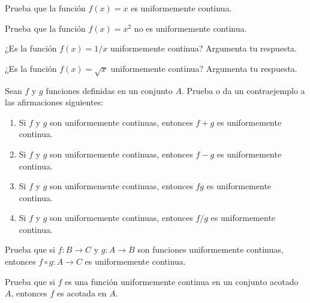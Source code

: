 \documentclass[12pt,a4paper]{book}
\begin{document}
    \begin{ejercicio}\label{ej:223}
        Prueba que la función $f(x)=x$ es uniformemente continua.
    \end{ejercicio}

    \begin{ejercicio}\label{ej:224}
        Prueba que la función $f(x)=x^{2}$ no es uniformemente
        continua.
    \end{ejercicio}

    \begin{ejercicio}\label{ej:225}
        ¿Es la función $f(x)=1/x$ uniformemente continua?
        Argumenta tu respuesta.
    \end{ejercicio}

    \begin{ejercicio}\label{ej:226}
        ¿Es la función $f(x)=\sqrt{x}$ uniformemente continua?
        Argumenta tu respuesta.
    \end{ejercicio}

    \begin{ejercicio}\label{ej:227}
        Sean $f$ y $g$ funciones definidas en un conjunto $A$. Prueba o
        da un contraejemplo a las afirmaciones siguientes:
        \begin{enumerate}[nosep]
            \item Si $f$ y $g$ son uniformemente continuas, entonces $f+g$ es uniformemente
            continua.
            \item Si $f$ y $g$ son uniformemente continuas, entonces $f-g$ es uniformemente
            continua.
            \item Si $f$ y $g$ son uniformemente continuas, entonces $fg$ es uniformemente
            continua.
            \item Si $f$ y $g$ son uniformemente continuas, entonces $f/g$ es uniformemente
            continua.
        \end{enumerate}
    \end{ejercicio}

    \begin{ejercicio}\label{ej:228}
        Prueba que si $f:B\to C$ y $g:A\to B$ son funciones uniformemente
        continuas, entonces $f\circ g:A\to C$ es uniformemente continua.
    \end{ejercicio}

    \begin{ejercicio}\label{ej:229}
        Prueba que si $f$ es una función uniformemente continua en
        un conjunto acotado $A$, entonces $f$ es acotada en $A$.
    \end{ejercicio}
\end{document}
